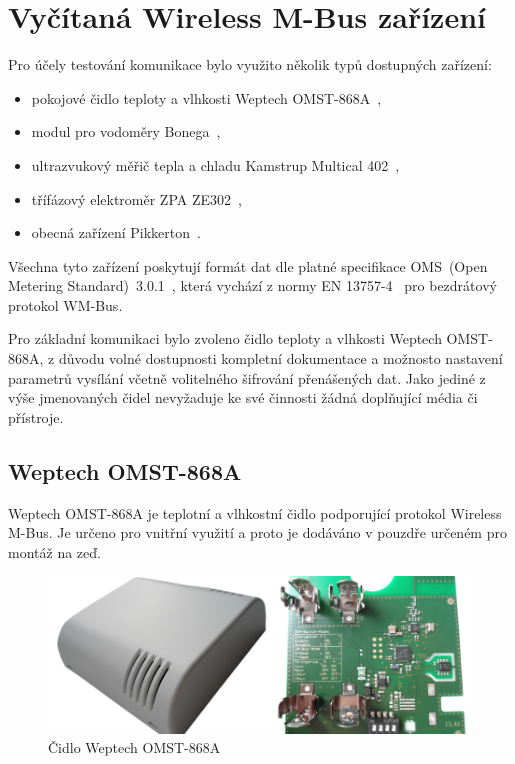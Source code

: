 \chapter{Vyčítaná Wireless M-Bus zařízení}

Pro účely testování komunikace bylo využito několik typů dostupných zařízení:
\begin{itemize}
	\item pokojové čidlo teploty a vlhkosti Weptech OMST-868A~\cite{CidloWeptech},
	\item modul pro vodoměry Bonega~\cite{CidloBonega},
	\item ultrazvukový měřič tepla a chladu Kamstrup Multical 402~\cite{CidloKamstrup},
	\item třífázový elektroměr ZPA ZE302~\cite{CidloZpa},
	\item obecná zařízení Pikkerton~\cite{CidloPikkerton}.
\end{itemize}

Všechna tyto zařízení poskytují formát dat dle platné specifikace OMS~(Open Metering Standard)~3.0.1~\cite{NormaOMS}, která vychází z normy EN 13757-4~\cite{Norma4} pro bezdrátový protokol WM-Bus.

Pro základní komunikaci bylo zvoleno čidlo teploty a vlhkosti Weptech OMST-868A, z důvodu volné dostupnosti kompletní dokumentace a možnosto nastavení parametrů vysílání včetně volitelného šifrování přenášených dat. Jako jediné z výše jmenovaných čidel nevyžaduje ke své činnosti žádná doplňující média či přístroje.
	
	
	
	\section{Weptech OMST-868A}
	
	Weptech OMST-868A je teplotní a vlhkostní čidlo podporující protokol Wireless M-Bus. Je určeno pro vnitřní využití a proto je dodáváno v pouzdře určeném pro montáž na zeď.
	
	 \begin{figure}[!ht]
  \begin{center}
    \includegraphics[scale=0.35]{obrazky/zarizeni_weptech}
  \end{center}
  \caption{Čidlo Weptech OMST-868A~\cite{CidloWeptech}}
\end{figure}



